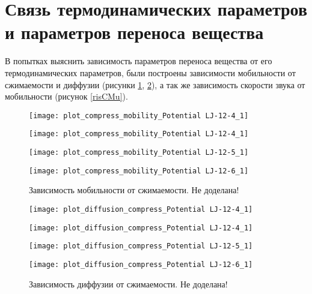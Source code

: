 \section{Связь термодинамических параметров и параметров переноса вещества}\label{C3_2}

В попытках выяснить зависимость параметров переноса вещества от его термодинамических параметров, были построены зависимости мобильности от сжимаемости и диффузии (рисунки \ref{risMuBeta}, \ref{risDBeta}), а так же зависимость скорости звука от мобильности (рисунок \ref{risCMu}).

\begin{figure}[h]
\begin{center}
\begin{minipage}[h]{0.45\linewidth}
\texttt{[image: plot\_compress\_mobility\_Potential LJ-12-4\_1]}
\end{minipage}
\begin{minipage}[h]{0.45\linewidth}
\texttt{[image: plot\_compress\_mobility\_Potential LJ-12-4\_1]}
\end{minipage}

\begin{minipage}[h]{0.45\linewidth}
\texttt{[image: plot\_compress\_mobility\_Potential LJ-12-5\_1]}
\end{minipage}
\begin{minipage}[h]{0.45\linewidth}
\texttt{[image: plot\_compress\_mobility\_Potential LJ-12-6\_1]}
\end{minipage}
\caption{Зависимость мобильности от сжимаемости. Не доделана!}
\label{risMuBeta}
\end{center}
\end{figure}


\begin{figure}[h]
\begin{center}
\begin{minipage}[h]{0.45\linewidth}
\texttt{[image: plot\_diffusion\_compress\_Potential LJ-12-4\_1]}
\end{minipage}
\begin{minipage}[h]{0.45\linewidth}
\texttt{[image: plot\_diffusion\_compress\_Potential LJ-12-4\_1]}
\end{minipage}

\begin{minipage}[h]{0.45\linewidth}
\texttt{[image: plot\_diffusion\_compress\_Potential LJ-12-5\_1]}
\end{minipage}
\begin{minipage}[h]{0.45\linewidth}
\texttt{[image: plot\_diffusion\_compress\_Potential LJ-12-6\_1]}
\end{minipage}
\caption{Зависимость диффузии от сжимаемости. Не доделана!}
\label{risDBeta}
\end{center}
\end{figure}



